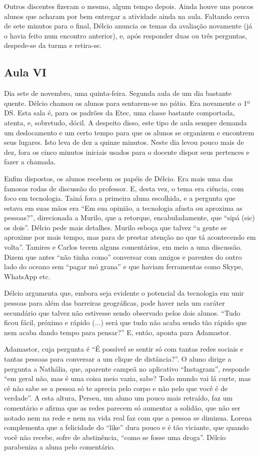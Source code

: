 \documentclass[12pt,a4paper]{article}
\begin{document}
	Outros discentes fizeram o mesmo, algum tempo depois. Ainda houve uns 
	poucos alunos que acharam por bem entregar a atividade ainda na aula. 
	Faltando cerca de sete minutos para o final, Délcio anuncia os temas 
	da avaliação novamente (já o havia feito num encontro anterior), e, 
	após responder duas ou três perguntas, despede-se da turma e retira-se. 

	\subsection*{Aula VI}
	
	Dia sete de novembro, uma quinta-feira. Segunda aula de um dia bastante 
	quente. Délcio chamou os alunos para sentarem-se no pátio. Era novamente 
	o 1º DS. Esta sala é, para os padrões da Etec, uma classe bastante 
	comportada, atenta, e, sobretudo, dócil. 
	A despeito disso, este tipo de aula sempre demanda 
	um deslocamento e um certo tempo para que os alunos se organizem e 
	encontrem seus lugares. Isto leva de dez a quinze minutos. Neste dia 
	levou pouco mais de dez, fora os cinco minutos iniciais usados para 
	o docente dispor seus pertences e fazer a chamada. 
	
	Enfim dispostos, os alunos recebem os papéis de Délcio. Era mais uma 
	das famosas rodas de discussão do professor. E, desta vez, o tema era 
	ciência, com foco em tecnologia. Tainá fora a primeira aluna escolhida, 
	e a pergunta que estava em suas mãos era “Em sua opinião, a tecnologia 
	afasta ou aproxima as pessoas?”, direcionada a Murilo, que a retorque, 
	encabuladamente, que “sipá (sic) os dois”. Délcio pede mais detalhes. 
	Murilo esboça que talvez ``a gente se aproxime por mais tempo, mas 
	para de prestar atenção no que tá acontecendo em volta''. Tamires e 
	Carlos tecem alguns comentários, em meio a uma discussão. Dizem que 
	antes ``não tinha como'' conversar com amigos e parentes do outro 
	lado do oceano sem ``pagar mó grana'' e que haviam ferramentas como 
	Skype, WhatsApp etc. 
	
	Délcio argumenta que, embora seja evidente o potencial da tecnologia 
	em unir pessoas para além das barreiras geográficas, pode haver nela 
	um caráter secundário que talvez não estivesse sendo observado pelos 
	dois alunos. ``Tudo ficou fácil, próximo e rápido (...) será que tudo 
	não acaba sendo tão rápido que nem acaba dando tempo para pensar?''
	E, então, aponta para Adamastor. 
	
	Adamastor, cuja pergunta é ``É possível se sentir só com tantas redes 
	sociais e tantas pessoas para conversar a um clique de distância?''. 
	O aluno dirige a pergunta a Nathália, que, aparente campeã no aplicativo 
	``Instagram'', responde ``em geral não, mas é uma coisa meio vazia, 
	sabe? Todo mundo vai lá curte, mas cê não sabe se a pessoa só te 
	aprecia pelo corpo e não pelo que você é de verdade''. A esta altura, 
	Perseu, um aluno um pouco mais retraído, faz um comentário e afirma 
	que as redes parecem só aumentar a solidão, que não ser notado nem 
	na rede e nem na vida real faz com que a pessoa se diminua. Lorena 
	complementa que a felicidade do ``like'' dura pouco e é tão viciante, 
	que quando você não recebe, sofre de abstinência, ``como se fosse 
	uma droga''. Délcio parabeniza a aluna pelo comentário. 
	
\end{document}
